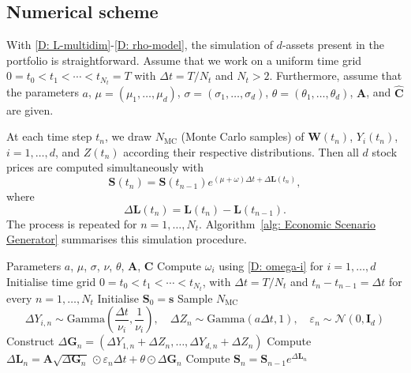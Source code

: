 \subsection{Numerical scheme}
\label{appendix: Numerical scheme}
With \eqref{D: L-multidim}-\eqref{D: rho-model}, the simulation of $d$-assets present in the portfolio is straightforward. Assume that we work on a uniform time grid $0=t_0 < t_1 < \cdots < t_{N_t}=T$ with $\Delta t = T/N_t$ and $N_t>2$. Furthermore, assume that the parameters $a$, $\mu=(\mu_1, \ldots, \mu_d)$, $\sigma=(\sigma_1, \ldots, \sigma_d)$, $\theta=(\theta_1, \ldots, \theta_d)$, $\mathbf{A}$, and $\hat{\mathbf{C}}$ are given.

At each time step $t_n$, we draw $N_{\text{MC}}$ (Monte Carlo samples) of $\mathbf{W}(t_n)$, $Y_i(t_n)$, $i=1,\ldots, d$, and $Z(t_n)$ according their respective distributions. Then all $d$ stock prices are computed simultaneously with
\begin{equation}
    \mathbf S(t_{n}) = \mathbf S(t_{n-1})e^{(\mu + \omega) \Delta t + \Delta \mathbf L(t_n)},
    \label{D: simulation of d stocks}
\end{equation}
where 
\begin{equation*}
    \Delta \mathbf L(t_n) = \mathbf{L}(t_{n}) - \mathbf{L}(t_{n-1}). 
\end{equation*}
The process is repeated for $n=1, \ldots, N_t$. Algorithm~\ref{alg: Economic Scenario Generator} summarises this simulation procedure. 
\begin{algorithm}[H]
\caption{Simulation procedure of $d$-correlated stocks via multivariate subordination}
\label{alg: Economic Scenario Generator}
\begin{algorithmic}[1]
\REQUIRE Parameters $a$, $\mu$, $\sigma$, $\nu$, $\theta$, $\mathbf{A}$, $\mathbf{C}$
\STATE Compute $\omega_i$ using \eqref{D: omega-i} for $i=1, \ldots, d$
\STATE Initialise time grid $0=t_0 < t_1 < \cdots < t_{N_t}$, with $\Delta t = T/N_t$ and $t_n-t_{n-1} = \Delta t$ for every $n=1,\ldots, N_t$
\STATE Initialise $\mathbf{S}_0=\mathbf{s}$
    \STATE Sample $N_{\text{MC}}$
    \begin{equation*}
        \Delta Y_{i,n} \sim \text{Gamma}\left(\frac{\Delta t}{\nu_i}, \frac{1}{\nu_i}\right), \quad \Delta Z_n \sim \text{Gamma} \left(a \Delta t,1\right), \quad \varepsilon_n \sim \mathcal{N}(0,\mathbf{I}_d)
    \end{equation*}
    \STATE Construct $\Delta \mathbf{G}_n = (\Delta Y_{1,n} + \Delta Z_n, \ldots, \Delta Y_{d,n} + \Delta Z_n)$
    \STATE Compute $\Delta \mathbf L_n = \mathbf A \sqrt{\Delta \mathbf{G}_n} \, \odot \varepsilon_n \Delta t + \theta \odot\Delta \mathbf{G}_n$
    \STATE Compute $\mathbf{S}_n = \mathbf{S}_{n-1}e^{\Delta \mathbf L_n}$
\ENDFOR
\end{algorithmic}
\end{algorithm}